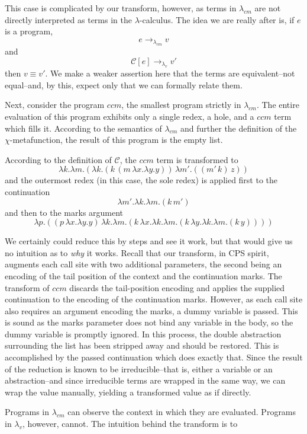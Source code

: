 \documentclass[ms,electronic,twosidetoc,letterpaper,chaptercenter,parttop]{byumsphd}
\begin{document}
This case is complicated by our transform, however, as terms in $\lambda_{cm}$ are not 
directly interpreted as terms in the $\lambda$-calculus. The idea we are really after is, 
if $e$ is a program,
\[
e\rightarrow_{\lambda_{cm}}v
\]
and
\[
\mathcal{C}[e]\rightarrow_{\lambda_{v}}v'
\]
then $v\equiv v'$. We make a weaker assertion here that the terms are equivalent--not 
equal--and, by this, expect only that we can formally relate them.

Next, consider the program $ccm$, the smallest program strictly in $\lambda_{cm}$. 
The entire evaluation of this program exhibits only a single redex, a hole, and a $ccm$ 
term which fills it. According to the semantics of $\lambda_{cm}$ and further the definition of the 
$\chi$-metafunction, the result of this program is the empty list.

According to the definition of $\mathcal{C}$, the $ccm$ term is transformed to
\[
\lambda k.\lambda m.(\lambda k.(k\,(m\,\lambda x.\lambda y.y))\,\lambda m'.((m'\,k)\,z))
\]
and the outermost redex (in this case, the sole redex) is applied first to the continuation
\[
\lambda m'.\lambda k.\lambda m.(k\,m')
\]
and then to the marks argument
\[
\lambda p.((p\,\lambda x.\lambda y.y)\,\lambda k.\lambda m.(k\,\lambda x.\lambda k.\lambda m.(k\,\lambda y.\lambda k.\lambda m.(k\,y))))
\]

We certainly could reduce this by steps and see it work, but that would give us no intuition as to \emph{why} it works. Recall that our transform, in CPS spirit, augments each call site with two additional parameters, the second being an encoding of the tail position of the context and the continuation marks. The transform of $ccm$ discards the tail-position encoding and applies the supplied continuation to the encoding of the continuation marks. However, as each call site also requires an argument encoding the marks, a dummy variable is passed. This is sound as the marks parameter does not bind any variable in the body, so the dummy variable is promptly ignored. In this process, the double abstraction surrounding the list has been stripped away and should be restored. This is accomplished by the passed continuation which does exactly that. Since the result of the reduction is known to be irreducible--that is, either a variable or an abstraction--and since irreducible terms are wrapped in the same way, we can wrap the value manually, yielding a transformed value as if directly.

Programs in $\lambda_{cm}$ can observe the context in which they are evaluated. Programs in $\lambda_v$, however, cannot. The intuition behind the transform is to 
\end{document}
